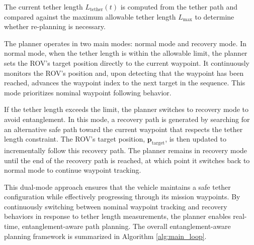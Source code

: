 The current tether length \(L_{\text{tether}}(t)\) is computed from the tether path and compared against the maximum allowable tether length \(L_{\max}\) to determine whether re-planning is necessary.

The planner operates in two main modes: normal mode and recovery mode. In normal mode, when the tether length is within the allowable limit, the planner sets the ROV’s target position directly to the current waypoint. It continuously monitors the ROV’s position and, upon detecting that the waypoint has been reached, advances the waypoint index to the next target in the sequence. This mode prioritizes nominal waypoint following behavior.

If the tether length exceeds the limit, the planner switches to recovery mode to avoid entanglement. In this mode, a recovery path is generated by searching for an alternative safe path toward the current waypoint that respects the tether length constraint. The ROV’s target position, $\mathbf{p}_{\text{target}}$,  is then updated to incrementally follow this recovery path. The planner remains in recovery mode until the end of the recovery path is reached, at which point it switches back to normal mode to continue waypoint tracking.

This dual-mode approach ensures that the vehicle maintains a safe tether configuration while effectively progressing through its mission waypoints. By continuously switching between nominal waypoint tracking and recovery behaviors in response to tether length measurements, the planner enables real-time, entanglement-aware path planning. The overall entanglement-aware planning framework is summarized in Algorithm \ref{alg:main_loop}.




